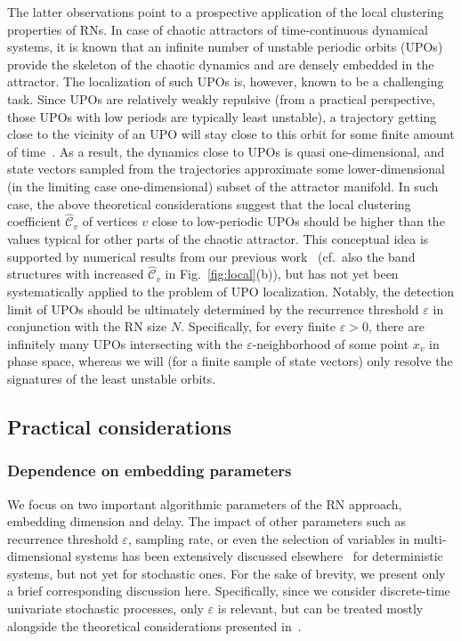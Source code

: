 		The latter observations point to a prospective application of the local clustering properties of RNs. In case of chaotic attractors of time-continuous dynamical systems, it is known that an infinite number of unstable periodic orbits (UPOs) provide the skeleton of the chaotic dynamics and are densely embedded in the attractor. The localization of such UPOs is, however, known to be a challenging task. Since UPOs are relatively weakly repulsive (from a practical perspective, those UPOs with low periods are typically least unstable), a trajectory getting close to the vicinity of an UPO will stay close to this orbit for some finite amount of time~\cite{Lathrop1989}. As a result, the dynamics close to UPOs is quasi one-dimensional, and state vectors sampled from the trajectories approximate some lower-dimensional (in the limiting case one-dimensional) subset of the attractor manifold. In such case, the above theoretical considerations suggest that the local clustering coefficient $\hat{\mathcal{C}}_v$ of vertices $v$ close to low-periodic UPOs should be higher than the values typical for other parts of the chaotic attractor. This conceptual idea is supported by numerical results from our previous work~\cite{Donner2010b,Donner2010a} (cf.\, also the band structures with increased $\hat{\mathcal{C}}_v$ in Fig.~\ref{fig:local}(b)), but has not yet been systematically applied to the problem of UPO localization. Notably, the detection limit of UPOs should be ultimately determined by the recurrence threshold $\varepsilon$ in conjunction with the RN size $N$. Specifically, for every finite $\varepsilon>0$, there are infinitely many UPOs intersecting with the $\varepsilon$-neighborhood of some point $x_v$ in phase space, whereas we will (for a finite sample of state vectors) only resolve the signatures of the least unstable orbits.


	\subsection{Practical considerations} \label{subsec:practicalRN}
		\subsubsection{Dependence on embedding parameters}
		We focus on two important algorithmic parameters of the RN approach, embedding dimension and delay. The impact of other parameters such as recurrence threshold $\varepsilon$, sampling rate, or even the selection of variables in multi-dimensional systems has been extensively discussed elsewhere~\cite{Donner2010b,Strozzi2009} for deterministic systems, but not yet for stochastic ones. For the sake of brevity, we present only a brief corresponding discussion here. Specifically, since we consider discrete-time univariate stochastic processes, only $\varepsilon$ is relevant, but can be treated mostly alongside the theoretical considerations presented in~\cite{Donges2012}.
		
